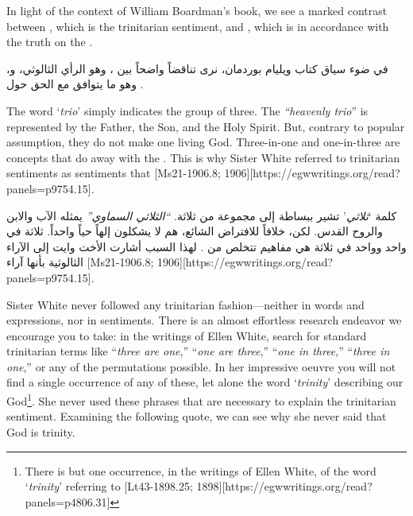 In light of the context of William Boardman’s book, we see a marked contrast between , which is the trinitarian sentiment, and , which is in accordance with the truth on the .


في ضوء سياق كتاب ويليام بوردمان، نرى تناقضاً واضحاً بين ، وهو الرأي الثالوثي، و، وهو ما يتوافق مع الحق حول .


The word ‘\textit{trio}’ simply indicates the group of three. The \textit{“heavenly trio}” is represented by the Father, the Son, and the Holy Spirit. But, contrary to popular assumption, they do not make one living God. Three-in-one and one-in-three are concepts that do away with the . This is why Sister White referred to trinitarian sentiments as sentiments that [Ms21-1906.8; 1906][https://egwwritings.org/read?panels=p9754.15].


كلمة ‘\textit{ثلاثي}’ تشير ببساطة إلى مجموعة من ثلاثة. \textit{“الثلاثي السماوي”} يمثله الآب والابن والروح القدس. لكن، خلافاً للافتراض الشائع، هم لا يشكلون إلهاً حياً واحداً. ثلاثة في واحد وواحد في ثلاثة هي مفاهيم تتخلص من . لهذا السبب أشارت الأخت وايت إلى الآراء الثالوثية بأنها آراء [Ms21-1906.8; 1906][https://egwwritings.org/read?panels=p9754.15].


Sister White never followed any trinitarian fashion—neither in words and expressions, nor in sentiments. There is an almost effortless research endeavor we encourage you to take: in the writings of Ellen White, search for standard trinitarian terms like “\textit{three are one},” “\textit{one are three},” “\textit{one in three},” “\textit{three in one},” or any of the permutations possible. In her impressive oeuvre you will not find a single occurrence of any of these, let alone the word ‘\textit{trinity}’ describing our God\footnote{There is but one occurrence, in the writings of Ellen White, of the word ‘\textit{trinity}’ referring to [Lt43-1898.25; 1898][https://egwwritings.org/read?panels=p4806.31]}. She never used these phrases that are necessary to explain the trinitarian sentiment. Examining the following quote, we can see why she never said that God is trinity.


